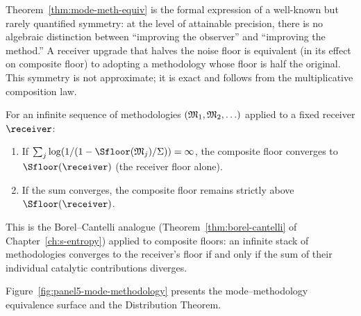 \begin{remark}\label{rem:symmetry}
Theorem~\ref{thm:mode-meth-equiv} is the formal expression of a well-known but rarely quantified symmetry: at the level of attainable precision, there is no algebraic distinction between ``improving the observer'' and ``improving the method.'' A receiver upgrade that halves the noise floor is equivalent (in its effect on composite floor) to adopting a methodology whose floor is half the original. This symmetry is not approximate; it is exact and follows from the multiplicative composition law.
\end{remark}

\begin{corollary}\label{cor:composite-bc}
For an infinite sequence of methodologies $(\mathfrak{M}_1, \mathfrak{M}_2, \ldots)$ applied to a fixed receiver $\receiver$:
\begin{enumerate}[nosep, label=(\roman*)]
  \item If $\sum_j \log(1/(1 - \Sfloor(\Meth_j)/\Sigma)) = \infty$, the composite floor converges to $\Sfloor(\receiver)$ (the receiver floor alone).
  \item If the sum converges, the composite floor remains strictly above $\Sfloor(\receiver)$.
\end{enumerate}
This is the Borel--Cantelli analogue (Theorem~\ref{thm:borel-cantelli} of Chapter~\ref{ch:s-entropy}) applied to composite floors: an infinite stack of methodologies converges to the receiver's floor if and only if the sum of their individual catalytic contributions diverges.
\end{corollary}

Figure~\ref{fig:panel5-mode-methodology} presents the mode--methodology equivalence surface and the Distribution Theorem.

